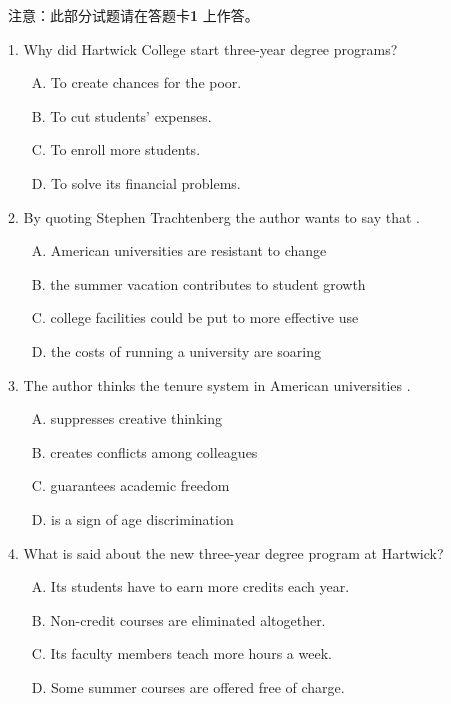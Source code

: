 \documentclass[UTF8,11pt]{ctexart}
\begin{document}
注意：此部分试题请在答题卡\textbf{1} 上作答。


1. Why did Hartwick College start three-year degree programs?


\begin{itemize}[leftmargin=2em,itemsep=.2em,topsep=.4em]\item[A.] To create chances for the poor.
\item[B.] To cut students’ expenses.
\item[C.] To enroll more students.
\item[D.] To solve its financial problems.
\end{itemize}

2. By quoting Stephen Trachtenberg the author wants to say that .


\begin{itemize}[leftmargin=2em,itemsep=.2em,topsep=.4em]\item[A.] American universities are resistant to change
\item[B.] the summer vacation contributes to student growth
\item[C.] college facilities could be put to more effective use
\item[D.] the costs of running a university are soaring
\end{itemize}

3. The author thinks the tenure system in American universities .


\begin{itemize}[leftmargin=2em,itemsep=.2em,topsep=.4em]\item[A.] suppresses creative thinking
\item[B.] creates conflicts among colleagues
\item[C.] guarantees academic freedom
\item[D.] is a sign of age discrimination
\end{itemize}

4. What is said about the new three-year degree program at Hartwick?


\begin{itemize}[leftmargin=2em,itemsep=.2em,topsep=.4em]\item[A.] Its students have to earn more credits each year.
\item[B.] Non-credit courses are eliminated altogether.
\item[C.] Its faculty members teach more hours a week.
\item[D.] Some summer courses are offered free of charge.
\end{itemize}
\end{document}
